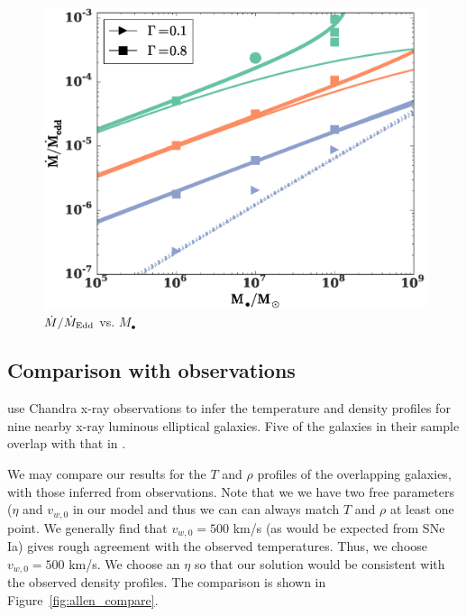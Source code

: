 \documentclass[usenatbib,fleqn]{mn2e}
\newcommand{\eddr}{\dot{M}/\dot{M}_{\rm Edd}}
\newcommand{\Mbh}[1][]{M_{\bullet#1}}
\newcommand{\vwO}{v_{w,0}}
\begin{document}
\begin{figure}
\includegraphics[width=\columnwidth]{mdot_mass.eps}
\caption{\label{fig:mdot_mass}$\eddr$ vs. $\Mbh$}
\end{figure}


\subsection{Comparison with observations}
\citealt{AllenDunn+:2006a} use Chandra x-ray observations to infer the temperature and density profiles for nine nearby x-ray luminous elliptical galaxies.  Five of the galaxies in their sample overlap with that in . 

We may compare our results for the $T$ and $\rho$ profiles of the overlapping galaxies, with those inferred from observations.  Note that we we have two free parameters ($\eta$ and $\vwO$ in our model and thus we can can always match $T$ and $\rho$ at least one point.  We generally find that $\vwO=500$ km/s (as would be expected from SNe Ia) gives rough agreement with the observed temperatures.  Thus, we choose $\vwO=500$ km/s.  We choose an $\eta$ so that our solution would be consistent with the observed density profiles. The comparison is shown in Figure~\ref{fig:allen_compare}.
\end{document}
